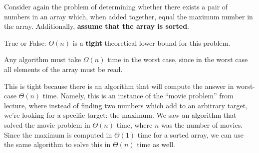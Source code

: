 \begin{prob}
    Consider again the problem of determining whether there exists a pair of numbers
    in an array which, when added together, equal the maximum number in the array.
    Additionally, \textbf{assume that the array is sorted}.

    True or False: $\Theta(n)$ is a \textbf{tight} theoretical lower bound for this
    problem.

    \Tf{}

    \begin{soln}
        Any algorithm must take $\Omega(n)$ time in the worst case, since in the worst
        case all elements of the array must be read.

        This is tight because there is an algorithm that will compute the answer in
        worst-case $\Theta(n)$ time. Namely, this is an instance of the ``movie problem''
        from lecture, where instead of finding two numbers which add to an arbitrary
        target, we're looking for a specific target: the maximum. We saw an algorithm
        that solved the movie problem in $\Theta(n)$ time, where $n$ was the number of
        movies.
        Since the maximum
        is computed in $\Theta(1)$ time for a sorted array, we can use the same algorithm
        to solve this in $\Theta(n)$ time as well.
    \end{soln}

\end{prob}
